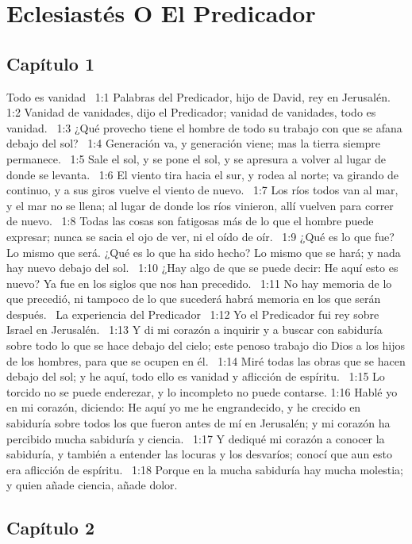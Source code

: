 \chapter{Eclesiastés O El Predicador}


\section*{Capítulo  1 }
Todo es vanidad  
1:1 Palabras del Predicador, hijo de David, rey en Jerusalén. 
1:2 Vanidad de vanidades, dijo el Predicador; vanidad de vanidades, todo es vanidad.  
1:3 ¿Qué provecho tiene el hombre de todo su trabajo con que se afana debajo del sol?  
1:4 Generación va, y generación viene; mas la tierra siempre permanece.  
1:5 Sale el sol, y se pone el sol, y se apresura a volver al lugar de donde se levanta.  
1:6 El viento tira hacia el sur, y rodea al norte; va girando de continuo, y a sus giros vuelve el viento de nuevo.  
1:7 Los ríos todos van al mar, y el mar no se llena; al lugar de donde los ríos vinieron, allí vuelven para correr de nuevo.  
1:8 Todas las cosas son fatigosas más de lo que el hombre puede expresar; nunca se sacia el ojo de ver, ni el oído de oír.  
1:9 ¿Qué es lo que fue? Lo mismo que será. ¿Qué es lo que ha sido hecho? Lo mismo que se hará; y nada hay nuevo debajo del sol.  
1:10 ¿Hay algo de que se puede decir: He aquí esto es nuevo? Ya fue en los siglos que nos han precedido.  
1:11 No hay memoria de lo que precedió, ni tampoco de lo que sucederá habrá memoria en los que serán después.  
La experiencia del Predicador  
1:12 Yo el Predicador fui rey sobre Israel en Jerusalén.  
1:13 Y di mi corazón a inquirir y a buscar con sabiduría sobre todo lo que se hace debajo del cielo; este penoso trabajo dio Dios a los hijos de los hombres, para que se ocupen en él.  
1:14 Miré todas las obras que se hacen debajo del sol; y he aquí, todo ello es vanidad y aflicción de espíritu.  
1:15 Lo torcido no se puede enderezar, y lo incompleto no puede contarse. 
1:16 Hablé yo en mi corazón, diciendo: He aquí yo me he engrandecido, y he crecido en sabiduría sobre todos los que fueron antes de mí en Jerusalén; y mi corazón ha percibido mucha sabiduría y ciencia.  
1:17 Y dediqué mi corazón a conocer la sabiduría, y también a entender las locuras y los desvaríos; conocí que aun esto era aflicción de espíritu.  
1:18 Porque en la mucha sabiduría hay mucha molestia; y quien añade ciencia, añade dolor.  
\section*{Capítulo 2 }

